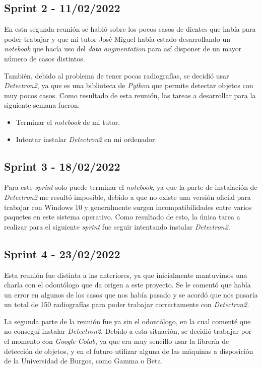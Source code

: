 \subsection{Sprint 2 - 11/02/2022}
En esta segunda reunión se habló sobre los pocos casos de dientes que había para poder trabajar y que mi tutor José Miguel había estado desarrollando un \emph{notebook} que hacía uso del \emph{data augmentation} para así disponer de un mayor número de casos distintos. 

También, debido al problema de tener pocas radiografías, se decidió usar \emph{Detectron2}, ya que es una biblioteca de \emph{Python} que permite detectar objetos con muy pocos casos.
Como resultado de esta reunión, las tareas a desarrollar para la siguiente semana fueron:
\begin{itemize}
    \item Terminar el \emph{notebook} de mi tutor.
    \item Intentar instalar \emph{Detectron2} en mi ordenador.
\end{itemize}

\subsection{Sprint 3 - 18/02/2022}
Para este \emph{sprint} solo puede terminar el \emph{notebook}, ya que la parte de instalación de \emph{Detectron2} me resultó imposible, debido a que no existe una versión oficial para trabajar con Windows 10 y generalmente surgen incompatibilidades entre varios paquetes en este sistema operativo. Como resultado de esto, la única tarea a realizar para el siguiente \emph{sprint} fue seguir intentando instalar \emph{Detectron2}.

\subsection{Sprint 4 - 23/02/2022}
Esta reunión fue distinta a las anteriores, ya que inicialmente mantuvimos una charla con el odontólogo que da origen a este proyecto. Se le comentó que había un error en algunos de los casos que nos había pasado y se acordó que nos pasaría un total de 150 radiografías para poder trabajar correctamente con \emph{Detectron2}.

La segunda parte de la reunión fue ya sin el odontólogo, en la cual comenté que no conseguí instalar \emph{Detectron2}. Debido a esta situación, se decidió trabajar por el momento con \emph{Google Colab}, ya que era muy sencillo usar la librería de detección de objetos, y en el futuro utilizar alguna de las máquinas a disposición de la Universidad de Burgos, como Gamma o Beta. 

